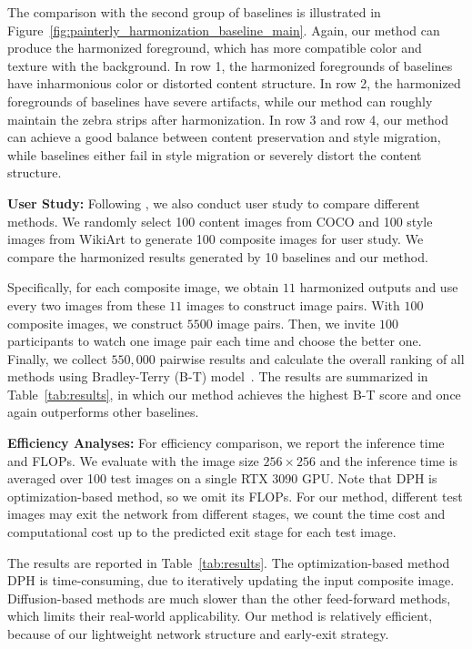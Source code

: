 \documentclass[letterpaper]{article} %
\begin{document}
The comparison with the second group of baselines is illustrated in Figure~\ref{fig:painterly_harmonization_baseline_main}. Again, our method can produce the harmonized foreground, which has more compatible color and texture with the background. In row 1, the harmonized foregrounds of baselines have inharmonious color or distorted content structure. In row 2, the harmonized foregrounds of baselines have severe artifacts, while our method can roughly maintain the zebra strips after harmonization. In row 3 and row 4, our method can achieve a good balance between content preservation and style migration, while baselines either fail in style migration or severely distort the content structure. 


\textbf{User Study: }Following \cite{cao2022painterly}, we also conduct user study to compare different methods. We randomly select 100 content images from COCO and 100 style images from WikiArt to generate 100 composite images for user study. We compare the harmonized results generated by 10 baselines and our method.

Specifically, for each composite image, we obtain $11$ harmonized outputs and use every two images from these $11$ images to construct image pairs. With $100$ composite images, we construct $5500$ image pairs. Then, we invite $100$ participants to watch one image pair each time and choose the better one. Finally, we collect $550,000$ pairwise results and calculate the overall ranking of all methods using Bradley-Terry (B-T) model~\cite{bradley1952rank,lai2016comparative}.  The results are summarized in Table~\ref{tab:results}, in which our method achieves the highest B-T score and once again outperforms other baselines.


\textbf{Efficiency Analyses: } For efficiency comparison, we report the inference time and FLOPs. We evaluate with the image size $256 \times 256$ and the inference time is averaged over 100 test images on a single RTX 3090 GPU.
Note that DPH is optimization-based method, so we omit its FLOPs.
For our method, different test images may exit the network from different stages, we count the time cost and computational cost up to the predicted exit stage for each test image.

The results are reported in Table~\ref{tab:results}. The optimization-based method DPH is time-consuming, due to iteratively updating the input composite image. Diffusion-based methods are much slower than the other feed-forward methods, which limits their real-world applicability. 
Our method is relatively efficient, because of our lightweight network structure and early-exit strategy.
\end{document}
